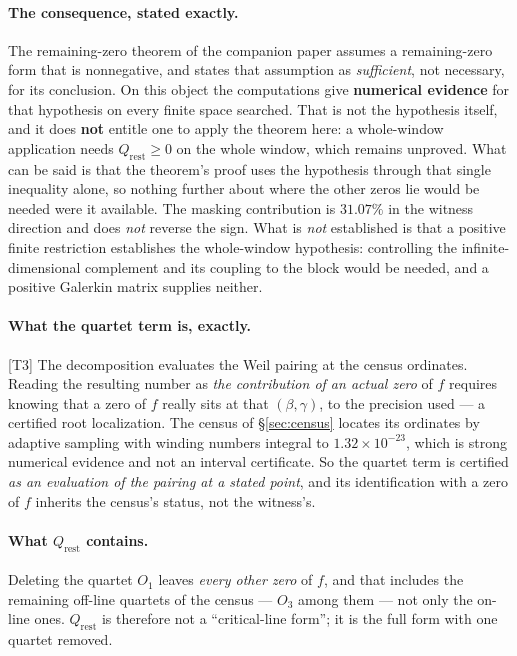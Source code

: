 \documentclass[11pt,a4paper]{article}
\theoremstyle{definition}
\theoremstyle{remark}
\newcommand{\tier}[1]{{\small\textsf{[#1]}}}
\newcommand{\Qrest}{Q_{\mathrm{rest}}}
\begin{document}
\paragraph{The consequence, stated exactly.} The remaining-zero theorem of the companion
paper assumes a remaining-zero form that is nonnegative, and states that assumption as
\emph{sufficient}, not necessary, for its conclusion. On this object the computations
give \textbf{numerical evidence} for that hypothesis on every finite space searched. That
is not the hypothesis itself, and it does \textbf{not} entitle one to apply the theorem
here: a whole-window application needs $\Qrest \ge 0$ on the whole window, which remains
unproved. What can be said is that the theorem's proof uses the hypothesis through that
single inequality alone, so nothing further about where the other zeros lie would be
needed were it available. The masking
contribution is $31.07\%$ in the witness direction and does \emph{not} reverse the sign.
What is \emph{not} established is that a positive finite restriction establishes the
whole-window hypothesis: controlling the infinite-dimensional complement and its coupling
to the block would be needed, and a positive Galerkin matrix supplies neither.

\paragraph{What the quartet term is, exactly.} \tier{T3} The decomposition evaluates the
Weil pairing at the census ordinates. Reading the resulting number as \emph{the
contribution of an actual zero} of $f$ requires knowing that a zero of $f$ really sits at
that $(\beta,\gamma)$, to the precision used --- a certified root localization. The census
of \S\ref{sec:census} locates its ordinates by adaptive sampling with winding numbers
integral to $1.32\times10^{-23}$, which is strong numerical evidence and not an interval
certificate. So the quartet term is certified \emph{as an evaluation of the pairing at a
stated point}, and its identification with a zero of $f$ inherits the census's status, not
the witness's.

\paragraph{What $\Qrest$ contains.} Deleting the quartet $O_1$ leaves \emph{every other
zero} of $f$, and that includes the remaining off-line quartets of the census --- $O_3$
among them --- not only the on-line ones. $\Qrest$ is therefore not a ``critical-line
form''; it is the full form with one quartet removed.
\end{document}
